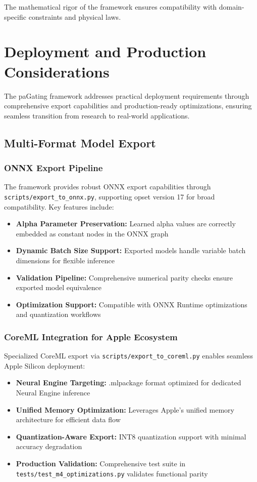 \documentclass[lettersize,journal]{IEEEtran}
\begin{document}
The mathematical rigor of the framework ensures compatibility with domain-specific constraints and physical laws.

\section{Deployment and Production Considerations}
\label{sec:deployment}

The paGating framework addresses practical deployment requirements through comprehensive export capabilities and production-ready optimizations, ensuring seamless transition from research to real-world applications.

\subsection{Multi-Format Model Export}

\subsubsection{ONNX Export Pipeline}
The framework provides robust ONNX export capabilities through \texttt{scripts/export\_to\_onnx.py}, supporting opset version 17 for broad compatibility. Key features include:
\begin{itemize}
\item \textbf{Alpha Parameter Preservation:} Learned alpha values are correctly embedded as constant nodes in the ONNX graph
\item \textbf{Dynamic Batch Size Support:} Exported models handle variable batch dimensions for flexible inference
\item \textbf{Validation Pipeline:} Comprehensive numerical parity checks ensure exported model equivalence
\item \textbf{Optimization Support:} Compatible with ONNX Runtime optimizations and quantization workflows
\end{itemize}

\subsubsection{CoreML Integration for Apple Ecosystem}
Specialized CoreML export via \texttt{scripts/export\_to\_coreml.py} enables seamless Apple Silicon deployment:
\begin{itemize}
\item \textbf{Neural Engine Targeting:} .mlpackage format optimized for dedicated Neural Engine inference
\item \textbf{Unified Memory Optimization:} Leverages Apple's unified memory architecture for efficient data flow
\item \textbf{Quantization-Aware Export:} INT8 quantization support with minimal accuracy degradation
\item \textbf{Production Validation:} Comprehensive test suite in \texttt{tests/test\_m4\_optimizations.py} validates functional parity
\end{itemize}
\end{document}
